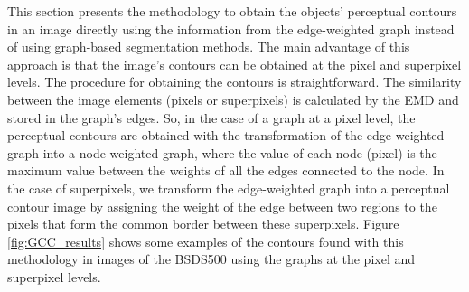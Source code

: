 This section presents the methodology to obtain the objects' perceptual contours in an image directly using the information from the edge-weighted graph instead of using graph-based segmentation methods. The main advantage of this approach is that the image's contours can be obtained at the pixel and superpixel levels. The procedure for obtaining the contours is straightforward. The similarity between the image elements (pixels or superpixels) is calculated by the EMD and stored in the graph's edges. So, in the case of a graph at a pixel level, the perceptual contours are obtained with the transformation of the edge-weighted graph into a node-weighted graph, where the value of each node (pixel) is the maximum value between the weights of all the edges connected to the node. In the case of superpixels, we transform the edge-weighted graph into a perceptual contour image by assigning the weight of the edge between two regions to the pixels that form the common border between these superpixels. Figure \ref{fig:GCC_results} shows some examples of the contours found with this methodology in images of the BSDS500 using the graphs at the pixel and superpixel levels. 

